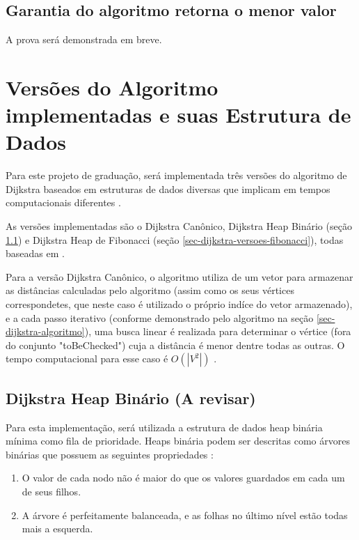\subsection{Garantia do algoritmo retorna o menor valor}
\label{sec-dijkstra-algoritmo-prova}
A prova será demonstrada em breve.

\section{Versões do Algoritmo implementadas e suas Estrutura de Dados}
\label{sec-dijkstra-versoes}
Para este projeto de graduação, será implementada três versões do algoritmo de Dijkstra baseados em estruturas de dados diversas que implicam em tempos computacionais diferentes \cite{cormen2009introduction}.

As versões implementadas são o Dijkstra Canônico, Dijkstra Heap Binário (seção \ref{sec-dijkstra-versoes-heap}) e Dijkstra Heap de Fibonacci (seção \ref{sec-dijkstra-versoes-fibonacci}), todas baseadas em .

Para a versão Dijkstra Canônico, o algoritmo utiliza de um vetor para armazenar as distâncias calculadas pelo algoritmo (assim como os seus vértices correspondetes, que neste caso é utilizado o próprio indíce do vetor armazenado), e a cada passo iterativo (conforme demonstrado pelo algoritmo na seção \ref{sec-dijkstra-algoritmo}), uma busca linear é realizada para determinar o vértice (fora do conjunto "toBeChecked") cuja a distância é menor dentre todas as outras. O tempo computacional para esse caso é $O(|V^{2}|)$ \cite{drozdek2012data}.

\subsection{Dijkstra Heap Binário (A revisar)}
\label{sec-dijkstra-versoes-heap}
Para esta implementação, será utilizada a estrutura de dados heap binária mínima como fila de prioridade. Heaps binária podem ser descritas como árvores binárias que possuem as seguintes propriedades \cite{drozdek2012data}:
\begin{enumerate}
 \item O valor de cada nodo não é maior do que os valores guardados em cada um de seus filhos.
 \item A árvore é perfeitamente balanceada, e as folhas no último nível estão todas mais a esquerda.
\end{enumerate}

